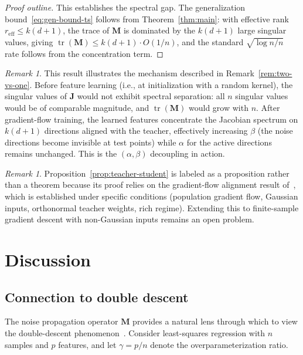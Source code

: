 \documentclass[12pt]{amsart}
\theoremstyle{definition}
\theoremstyle{remark}
\newtheorem{remark}[theorem]{Remark}
\DeclareMathOperator{\tr}{tr}
\newcommand{\bJ}{\mathbf{J}}
\newcommand{\bM}{\mathbf{M}}
\begin{document}
\begin{proof}[Proof outline]
This establishes the spectral gap.  The generalization bound~\eqref{eq:gen-bound-ts}
follows from Theorem~\ref{thm:main}: with effective rank
$r_{\mathrm{eff}} \leq k(d+1)$, the trace of $\bM$ is dominated by the
$k(d+1)$ large singular values, giving
$\tr(\bM) \leq k(d+1) \cdot O(1/n)$, and the standard $\sqrt{\log n / n}$
rate follows from the concentration term.
\end{proof}

\begin{remark}\label{rem:feature-learning}
This result illustrates the mechanism described in Remark~\ref{rem:two-vs-one}.
Before feature learning (i.e., at initialization with a random kernel), the
singular values of $\bJ$ would not exhibit spectral separation: all $n$ singular
values would be of comparable magnitude, and $\tr(\bM)$ would grow with $n$.
After gradient-flow training, the learned features concentrate the Jacobian
spectrum on $k(d+1)$ directions aligned with the teacher, effectively increasing
$\beta$ (the noise directions become invisible at test points) while $\alpha$
for the active directions remains unchanged.  This is the $(\alpha, \beta)$
decoupling in action.
\end{remark}

\begin{remark}\label{rem:proposition-status}
Proposition~\ref{prop:teacher-student} is labeled as a proposition rather than a
theorem because its proof relies on the gradient-flow alignment result
of~\cite{BF2022}, which is established under specific conditions (population
gradient flow, Gaussian inputs, orthonormal teacher weights, rich regime).
Extending this to finite-sample gradient descent with non-Gaussian inputs
remains an open problem.
\end{remark}

\section{Discussion}\label{sec:discussion}

\subsection{Connection to double descent}

The noise propagation operator $\bM$ provides a natural lens through which to
view the double-descent phenomenon~\cite{HMRT2022}.  Consider least-squares
regression with $n$ samples and $p$ features, and let $\gamma = p/n$ denote the
overparameterization ratio.
\end{document}
